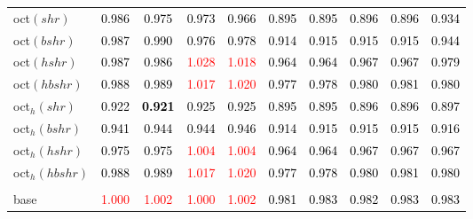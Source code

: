 \begin{tabular}[t]{>{\centering\arraybackslash}m{2.5cm}ccccccccc}
oct$(shr)$ & \textcolor{black}{0.986} & \textcolor{black}{0.975} & \textcolor{black}{0.973} & \textcolor{black}{0.966} & \textcolor{black}{0.895} & \textcolor{black}{0.895} & \textcolor{black}{0.896} & \textcolor{black}{0.896} & \textcolor{black}{0.934}\\
oct$(bshr)$ & \textcolor{black}{0.987} & \textcolor{black}{0.990} & \textcolor{black}{0.976} & \textcolor{black}{0.978} & \textcolor{black}{0.914} & \textcolor{black}{0.915} & \textcolor{black}{0.915} & \textcolor{black}{0.915} & \textcolor{black}{0.944}\\
oct$(hshr)$ & \textcolor{black}{0.987} & \textcolor{black}{0.986} & \textcolor{red}{1.028} & \textcolor{red}{1.018} & \textcolor{black}{0.964} & \textcolor{black}{0.964} & \textcolor{black}{0.967} & \textcolor{black}{0.967} & \textcolor{black}{0.979}\\
oct$(hbshr)$ & \textcolor{black}{0.988} & \textcolor{black}{0.989} & \textcolor{red}{1.017} & \textcolor{red}{1.020} & \textcolor{black}{0.977} & \textcolor{black}{0.978} & \textcolor{black}{0.980} & \textcolor{black}{0.981} & \textcolor{black}{0.980}\\
oct$_h(shr)$ & \textcolor{black}{0.922} & \textcolor{black}{\textbf{0.921}} & \textcolor{black}{0.925} & \textcolor{black}{0.925} & \textcolor{black}{0.895} & \textcolor{black}{0.895} & \textcolor{black}{0.896} & \textcolor{black}{0.896} & \textcolor{black}{0.897}\\
oct$_h(bshr)$ & \textcolor{black}{0.941} & \textcolor{black}{0.944} & \textcolor{black}{0.944} & \textcolor{black}{0.946} & \textcolor{black}{0.914} & \textcolor{black}{0.915} & \textcolor{black}{0.915} & \textcolor{black}{0.915} & \textcolor{black}{0.916}\\
oct$_h(hshr)$ & \textcolor{black}{0.975} & \textcolor{black}{0.975} & \textcolor{red}{1.004} & \textcolor{red}{1.004} & \textcolor{black}{0.964} & \textcolor{black}{0.964} & \textcolor{black}{0.967} & \textcolor{black}{0.967} & \textcolor{black}{0.967}\\
oct$_h(hbshr)$ & \textcolor{black}{0.988} & \textcolor{black}{0.989} & \textcolor{red}{1.017} & \textcolor{red}{1.020} & \textcolor{black}{0.977} & \textcolor{black}{0.978} & \textcolor{black}{0.980} & \textcolor{black}{0.981} & \textcolor{black}{0.980}\\
\addlinespace[0.3em]
\multicolumn{10}{c}{\textbf{$k = 1$}}\\
base & \textcolor{red}{1.000} & \textcolor{red}{1.002} & \textcolor{red}{1.000} & \textcolor{red}{1.002} & \textcolor{black}{0.981} & \textcolor{black}{0.983} & \textcolor{black}{0.982} & \textcolor{black}{0.983} & \textcolor{black}{0.983}\\

\end{tabular}
